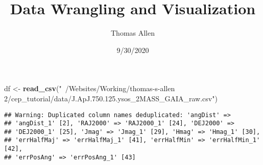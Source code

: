 \documentclass[]{article}
\title{Data Wrangling and Visualization}
\author{Thomas Allen}
\date{9/30/2020}
\newenvironment{Shaded}{\begin{snugshade}}{\end{snugshade}}
\newcommand{\CommentTok}[1]{\textcolor[rgb]{0.56,0.35,0.01}{\textit{#1}}}
\newcommand{\ControlFlowTok}[1]{\textcolor[rgb]{0.13,0.29,0.53}{\textbf{#1}}}
\newcommand{\DataTypeTok}[1]{\textcolor[rgb]{0.13,0.29,0.53}{#1}}
\newcommand{\DecValTok}[1]{\textcolor[rgb]{0.00,0.00,0.81}{#1}}
\newcommand{\FloatTok}[1]{\textcolor[rgb]{0.00,0.00,0.81}{#1}}
\newcommand{\KeywordTok}[1]{\textcolor[rgb]{0.13,0.29,0.53}{\textbf{#1}}}
\newcommand{\NormalTok}[1]{#1}
\newcommand{\OperatorTok}[1]{\textcolor[rgb]{0.81,0.36,0.00}{\textbf{#1}}}
\newcommand{\StringTok}[1]{\textcolor[rgb]{0.31,0.60,0.02}{#1}}
\begin{document}
\maketitle

\begin{Shaded}
\end{Shaded}

\begin{Shaded}
\begin{Highlighting}[]
\NormalTok{df <-}\StringTok{ }\KeywordTok{read_csv}\NormalTok{(}\StringTok{"~/Websites/Working/thomas-s-allen 2/cep_tutorial/data/J.ApJ.750.125.ysos_2MASS_GAIA_raw.csv"}\NormalTok{)}
\end{Highlighting}
\end{Shaded}

\begin{verbatim}
## Warning: Duplicated column names deduplicated: 'angDist' =>
## 'angDist_1' [2], 'RAJ2000' => 'RAJ2000_1' [24], 'DEJ2000' =>
## 'DEJ2000_1' [25], 'Jmag' => 'Jmag_1' [29], 'Hmag' => 'Hmag_1' [30],
## 'errHalfMaj' => 'errHalfMaj_1' [41], 'errHalfMin' => 'errHalfMin_1' [42],
## 'errPosAng' => 'errPosAng_1' [43]
\end{verbatim}
\end{document}
